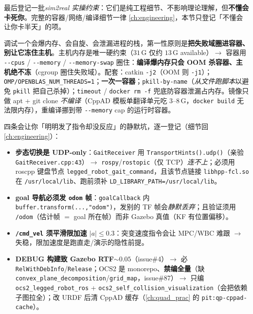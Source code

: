 最后登记一批\emph{sim2real 实操约束}：它们是纯工程细节、不影响理论理解，但\textbf{不懂会卡死你}。完整的容器/网络/编译细节一律 \cref{ch:engineering}，本节只登记「不懂会让你卡半天」的项。

\begin{insight}\label{ins:qadv-container}
调试一个会爆内存、会自旋、会泄漏进程的栈，第一性原则是\textbf{把失败域圈进容器、别让它冻住主机}。主机内存是唯一硬约束（$31$\,G 仅约 $13$\,G available）$\to$ 容器用 \texttt{-{}-cpus} / \texttt{-{}-memory} / \texttt{-{}-memory-swap} 圈住：\textbf{编译爆内存只会 OOM 杀容器、主机绝不冻}（cgroup 圈住失败域）。配套：catkin \texttt{-j2}（OOM 则 \texttt{-j1}）；\texttt{OMP/OPENBLAS\_NUM\_THREADS=1}；\textbf{一次一容器}；\texttt{pkill-by-name}（\emph{从文件跑脚本}以避免 \texttt{pkill} 把自己杀掉）；\texttt{timeout} / \texttt{docker rm -f} 兜底防容器泄漏占内存。镜像只做 apt + git clone \emph{不编译}（CppAD 模板单翻译单元吃 $3$–$8$\,G，\texttt{docker build} 无法限内存），重编译挪到带 \texttt{-{}-memory} cap 的运行时容器。
\end{insight}

\begin{note}\label{note:qadv-silent}
四条会让你「明明发了指令却没反应」的静默坑，逐一登记（细节回 \cref{ch:engineering}）：
\begin{itemize}
  \item \textbf{步态切换是 UDP-only}：\texttt{GaitReceiver} 用 \texttt{TransportHints().udp()}（亲验 \texttt{GaitReceiver.cpp:43}）$\to$ \texttt{rospy}/\texttt{rostopic}（仅 TCP）\emph{连不上}；必须用 roscpp 键盘节点 \texttt{legged\_robot\_gait\_command}，且该节点链接 \texttt{libhpp-fcl.so} 在 \texttt{/usr/local/lib}、跑前须补 \texttt{LD\_LIBRARY\_PATH=/usr/local/lib}。
  \item \textbf{goal 导航必须发 \texttt{odom} 帧}：\texttt{goalCallback} 内 \texttt{buffer.transform(...,"odom")}，发别的 TF 帧会\emph{静默丢弃}；且验证须用 \texttt{/odom}（估计帧 $=$ goal 所在帧）而非 Gazebo 真值（KF 有位置偏移）。
  \item \textbf{\texttt{/cmd\_vel} 须平滑限加速 $|a|\le0.3$}：突变速度指令会让 MPC/WBC 难跟 $\to$ 失稳，限加速度是跑直走/演示的隐性前提。
  \item \textbf{DEBUG 构建致 Gazebo RTF$\sim0.05$}（issue\#4）$\to$ 必 \texttt{RelWithDebInfo}/\texttt{Release}；OCS2 是 monorepo、\textbf{禁编全量}（缺 \texttt{convex\_plane\_decomposition}/\texttt{grid\_map}，issue\#87）$\to$ 只编 \texttt{ocs2\_legged\_robot\_ros} + \texttt{ocs2\_self\_collision\_visualization}（会把依赖子图拉全）；改 URDF 后清 CppAD 缓存（\cref{ch:quad_prac} 的 \texttt{pit:qp-cppad-cache}）。
\end{itemize}
\end{note}

